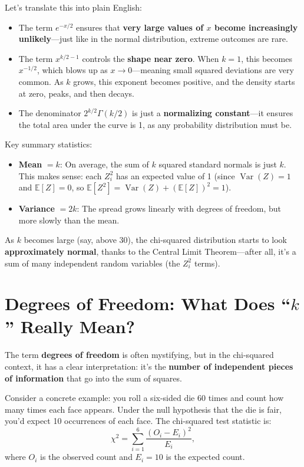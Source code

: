 \documentclass[12pt]{article}
\begin{document}
Let’s translate this into plain English:
\begin{itemize}
\item The term $e^{-x/2}$ ensures that \textbf{very large values of $x$ become increasingly unlikely}—just like in the normal distribution, extreme outcomes are rare.
    \item The term $x^{k/2 - 1}$ controls the \textbf{shape near zero}. When $k = 1$, this becomes $x^{-1/2}$, which blows up as $x \to 0$—meaning small squared deviations are very common. As $k$ grows, this exponent becomes positive, and the density starts at zero, peaks, and then decays.
    \item The denominator $2^{k/2} \Gamma(k/2)$ is just a \textbf{normalizing constant}—it ensures the total area under the curve is 1, as any probability distribution must be.
\end{itemize}

Key summary statistics:
\begin{itemize}
\item \textbf{Mean} $= k$: On average, the sum of $k$ squared standard normals is just $k$. This makes sense: each $Z_i^2$ has an expected value of 1 (since $\operatorname{Var}(Z) = 1$ and $\mathbb{E}[Z] = 0$, so $\mathbb{E}[Z^2] = \operatorname{Var}(Z) + (\mathbb{E}[Z])^2 = 1$).
    \item \textbf{Variance} $= 2k$: The spread grows linearly with degrees of freedom, but more slowly than the mean.
\end{itemize}
As $k$ becomes large (say, above 30), the chi-squared distribution starts to look \textbf{approximately normal}, thanks to the Central Limit Theorem—after all, it’s a sum of many independent random variables (the $Z_i^2$ terms).

\section*{Degrees of Freedom: What Does ``$k$'' Really Mean?}

The term \textbf{degrees of freedom} is often mystifying, but in the chi-squared context, it has a clear interpretation: it’s the \textbf{number of independent pieces of information} that go into the sum of squares.

Consider a concrete example: you roll a six-sided die 60 times and count how many times each face appears. Under the null hypothesis that the die is fair, you’d expect 10 occurrences of each face. The chi-squared test statistic is:
\[
\chi^2 = \sum_{i=1}^6 \frac{(O_i - E_i)^2}{E_i},
\]
where $O_i$ is the observed count and $E_i = 10$ is the expected count.
\end{document}
